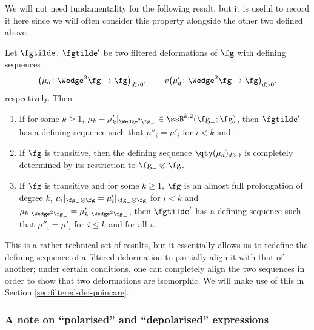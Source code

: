 We will not need fundamentality for the following result, but it is useful to record it here since we will often consider this property alongside the other two defined above.

\begin{Proposition}\label{prop:def-seq-redef}
	Let $\fgtilde$, $\fgtilde'$ be two filtered deformations of $\fg$ with defining sequences
\[
\bigl(\mu_d\colon\Wedge^2\fg\to\fg\bigr)_{d> 0}, \qquad v\bigl(\mu'_d\colon\Wedge^2\fg\to\fg\bigr)_{d> 0},
\]
 respectively. Then
	\begin{enumerate}\itemsep=0pt
		\item[$(1)$] {\rm\cite[\emph{Proposition}~2.3]{Cheng1998}} If for some $k\geq 1$, $\mu_k-\mu_k'|_{\Wedge^2\fg_-}\in\ssB^{k,2}(\fg_-;\fg)$, then $\fgtilde'$ has a defining sequence  such that $\mu''_i=\mu'_i$ for $i<k$ and .
			\label{item:def-seq-redef-1}
		\item[$(2)$] {\rm\cite[\emph{Proposition}~2.5]{Cheng1998}} If $\fg$ is transitive, then the defining sequence $\qty(\mu_d)_{d> 0}$ is completely determined by its restriction to $\fg_-\otimes\fg$.
			\label{item:def-seq-redef-2}
		\item[$(3)$] {\rm\cite[\emph{Proposition}~2.6]{Cheng1998}} If $\fg$ is transitive and for some $k\geq 1$, $\fg$ is an almost full prolongation of degree $k$, $\mu_i|_{\fg_-\otimes\fg}=\mu'_i|_{\fg_-\otimes\fg}$ for $i<k$ and $\mu_k|_{\Wedge^2\fg_-}=\mu'_k|_{\Wedge^2\fg_-}$, then $\fgtilde'$ has a defining sequence  such that $\mu''_i=\mu'_i$ for $i\leq k$ and  for all $i$.
			\label{item:def-seq-redef-3}
	\end{enumerate}
\end{Proposition}

This is a rather technical set of results, but it essentially allows us to redefine the defining sequence of a filtered deformation to partially align it with that of another; under certain conditions, one can completely align the two sequences in order to show that two deformations are isomorphic. We will make use of this in Section \ref{sec:filtered-def-poincare}.

\subsubsection{A note on ``polarised'' and ``depolarised'' expressions}
\label{sec:polarisation}

